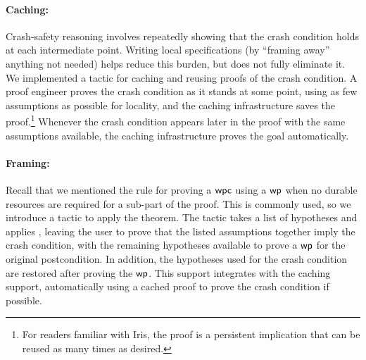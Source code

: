 \paragraph{Caching:} Crash-safety reasoning involves repeatedly showing
that the crash condition holds at each intermediate point.
Writing local specifications (by ``framing away'' anything not needed)
helps reduce this burden, but does not fully eliminate it.
We implemented a tactic for caching and reusing proofs of the crash condition.
A proof
engineer proves the crash condition as it stands at some point, using
as few assumptions as possible for locality, and the caching infrastructure saves
the proof.\footnote{For readers familiar with Iris, the proof is a persistent
implication that can be reused as many times as desired.}
Whenever the
crash condition appears later in the proof with the same assumptions available,
the caching infrastructure proves the goal automatically.

\paragraph{Framing:} Recall that we mentioned the  rule for
proving a $\textsf{\upshape wpc}$ using a $\textsf{\upshape wp}$ when no durable resources are required for a
sub-part of the proof. This is commonly used, so we introduce a 
tactic to apply the theorem. The tactic takes a list of hypotheses and applies
, leaving the user to prove that the listed assumptions
together imply the crash condition, with the remaining hypotheses available to
prove a $\textsf{\upshape wp}$ for the original postcondition. In addition, the hypotheses used
for the crash condition are restored after proving the $\textsf{\upshape wp}$. This support
integrates with the caching support, automatically using a cached proof to prove
the crash condition if possible.

